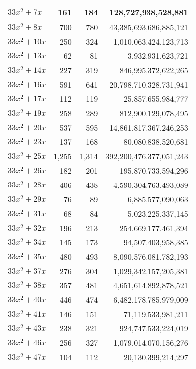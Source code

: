 \documentclass[a4paper]{amsproc}
\theoremstyle{plain}
\theoremstyle{named}
\begin{document}
\begin{longtable}{ | l | r | r | r | }
$33x^2 + 7x$ & 161 & 184 & 128{,}727{,}938{,}528{,}881 \\ \hline
$33x^2 + 8x$ & 700 & 780 & 43{,}385{,}693{,}686{,}885{,}121 \\ \hline
$33x^2 + 10x$ & 250 & 324 & 1{,}010{,}063{,}424{,}123{,}713 \\ \hline
$33x^2 + 13x$ & 62 & 81 & 3{,}932{,}931{,}623{,}721 \\ \hline
$33x^2 + 14x$ & 227 & 319 & 846{,}995{,}372{,}622{,}265 \\ \hline
$33x^2 + 16x$ & 591 & 641 & 20{,}798{,}710{,}328{,}731{,}941 \\ \hline
$33x^2 + 17x$ & 112 & 119 & 25{,}857{,}655{,}984{,}777 \\ \hline
$33x^2 + 19x$ & 258 & 289 & 812{,}900{,}129{,}078{,}495 \\ \hline
$33x^2 + 20x$ & 537 & 595 & 14{,}861{,}817{,}367{,}246{,}253 \\ \hline
$33x^2 + 23x$ & 137 & 168 & 80{,}080{,}838{,}520{,}681 \\ \hline
$33x^2 + 25x$ & 1{,}255 & 1{,}314 & 392{,}200{,}476{,}377{,}051{,}243 \\ \hline
$33x^2 + 26x$ & 182 & 201 & 195{,}870{,}733{,}594{,}296 \\ \hline
$33x^2 + 28x$ & 406 & 438 & 4{,}590{,}304{,}763{,}493{,}089 \\ \hline
$33x^2 + 29x$ & 76 & 89 & 6{,}885{,}577{,}090{,}063 \\ \hline
$33x^2 + 31x$ & 68 & 84 & 5{,}023{,}225{,}337{,}145 \\ \hline
$33x^2 + 32x$ & 196 & 213 & 254{,}669{,}177{,}461{,}394 \\ \hline
$33x^2 + 34x$ & 145 & 173 & 94{,}507{,}403{,}958{,}385 \\ \hline
$33x^2 + 35x$ & 480 & 493 & 8{,}090{,}576{,}081{,}782{,}193 \\ \hline
$33x^2 + 37x$ & 276 & 304 & 1{,}029{,}342{,}157{,}205{,}381 \\ \hline
$33x^2 + 38x$ & 357 & 481 & 4{,}651{,}614{,}892{,}878{,}521 \\ \hline
$33x^2 + 40x$ & 446 & 474 & 6{,}482{,}178{,}785{,}979{,}009 \\ \hline
$33x^2 + 41x$ & 146 & 151 & 71{,}119{,}533{,}981{,}211 \\ \hline
$33x^2 + 43x$ & 238 & 321 & 924{,}747{,}533{,}224{,}019 \\ \hline
$33x^2 + 46x$ & 256 & 327 & 1{,}079{,}014{,}070{,}156{,}276 \\ \hline
$33x^2 + 47x$ & 104 & 112 & 20{,}130{,}399{,}214{,}297 \\ \hline

\end{longtable}
\end{document}
